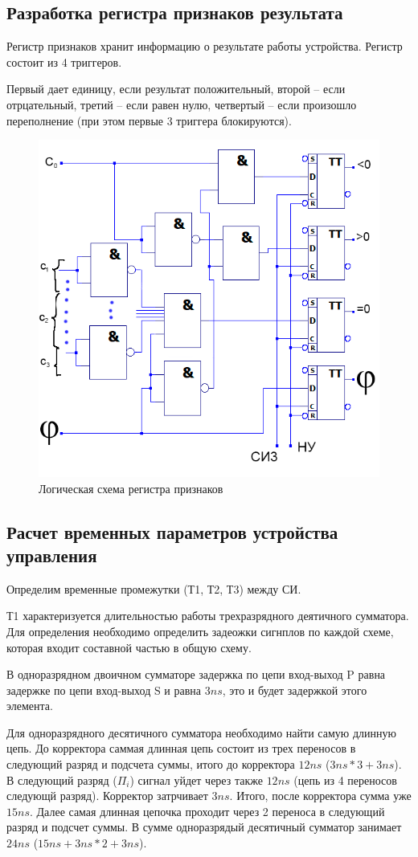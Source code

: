 \documentclass[a4paper,14pt]{article}
\begin{document}
\subsection{Разработка регистра признаков результата}

Регистр признаков хранит информацию о результате работы устройства.
Регистр состоит из 4 триггеров.

Первый дает единицу, если результат положительный, второй -- если отрцательный, третий -- если равен нулю, четвертый -- если произошло переполнение (при этом первые 3 триггера блокируются).

\begin{figure}[H]
	\centering
	\includegraphics[width=0.5\linewidth]{images/prizn_sh}
	\caption{Логическая схема регистра признаков}
	\label{fig:prizn_sh}
\end{figure}

\subsection{Расчет временных параметров устройства управления}

Определим временные промежутки (Т1, Т2, Т3) между СИ.

Т1 характеризуется длительностью работы трехразрядного деятичного сумматора.
Для определения необходимо определить задеожки сигнплов по каждой схеме, которая входит составной частью в общую схему.

В одноразрядном двоичном сумматоре задержка по цепи вход-выход P равна задержке по цепи вход-выход S и равна $3ns$, это и будет задержкой этого элемента.

Для одноразрядного десятичного сумматора необходимо найти самую длинную цепь. До корректора саммая длинная цепь состоит из трех переносов в следующий разряд и подсчета суммы, итого до корректора $12ns$ ($3ns * 3 + 3ns$).
В следующий разряд ($\Pi_i$) сигнал уйдет через также $12ns$ (цепь из 4 переносов следующй разряд).
Корректор затрчивает $3ns$. Итого, после корректора сумма уже $15ns$.
Далее самая длинная цепочка проходит через 2 переноса в следующий разряд и подсчет суммы.
В сумме одноразрядый десятичный сумматор занимает $24ns$ ($15ns + 3ns * 2 + 3 ns$).
\end{document}
